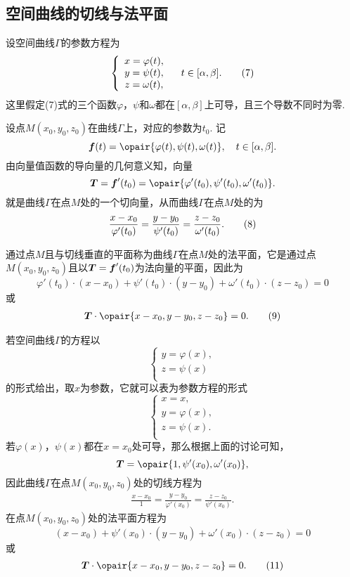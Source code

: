 \subsection{空间曲线的切线与法平面}
设空间曲线\(\Gamma\)的参数方程为\begin{gather}
\left\{ \begin{array}{c}
x = \varphi(t), \\
y = \psi(t), \\
z = \omega(t), \\
\end{array} \right.
\quad
t \in [\alpha,\beta].
\tag7
\end{gather}这里假定(7)式的三个函数\(\varphi\)，\(\psi\)和\(\omega\)都在\([\alpha,\beta]\)上可导，且三个导数不同时为零.

设点\(M(x_0,y_0,z_0)\)在曲线\(\Gamma\)上，对应的参数为\(t_0\).
记\[
\mat{f}(t)=\opair{\varphi(t),\psi(t),\omega(t)},
\quad t\in[\alpha,\beta].
\]由向量值函数的导向量的几何意义知，向量
\begin{equation}
\mat{T} = \mat{f}'(t_0) = \opair{\varphi'(t_0),\psi'(t_0),\omega'(t_0)}.
\end{equation}
就是曲线\(\Gamma\)在点\(M\)处的一个切向量，从而曲线\(\Gamma\)在点\(M\)处的为\begin{gather}
\frac{x-x_0}{\varphi'(t_0)}
=\frac{y-y_0}{\psi'(t_0)}
=\frac{z-z_0}{\omega'(t_0)}.
\tag8
\end{gather}

通过点\(M\)且与切线垂直的平面称为曲线\(\Gamma\)在点\(M\)处的法平面，它是通过点\(M(x_0,y_0,z_0)\)且以\(\boldsymbol{T}=\boldsymbol{f}'(t_0)\)为法向量的平面，因此为\[
\varphi'(t_0) \cdot (x-x_0) + \psi'(t_0) \cdot (y-y_0) + \omega'(t_0) \cdot (z-z_0) = 0
\]或\begin{gather}
\mat{T}\cdot\opair{x-x_0,y-y_0,z-z_0}=0.
\tag9
\end{gather}

若空间曲线\(\Gamma\)的方程以\[
\left\{ \begin{array}{l}
y = \varphi(x), \\
z = \psi(x) \\
\end{array} \right.
\]的形式给出，取\(x\)为参数，它就可以表为参数方程的形式\[
\left\{ \begin{array}{l}
x = x, \\
y = \varphi(x), \\
z = \psi(x). \\
\end{array} \right.
\]若\(\varphi(x)\)，\(\psi(x)\)都在\(x=x_0\)处可导，那么根据上面的讨论可知，\[
\mat{T} = \opair{1,\psi'(x_0),\omega'(x_0)},
\]因此曲线\(\Gamma\)在点\(M(x_0,y_0,z_0)\)处的切线方程为\begin{gather}
\frac{x-x_0}{1}
=\frac{y-y_0}{\varphi'(x_0)}
=\frac{z-z_0}{\psi'(x_0)}.
\tag{10}
\end{gather}在点\(M(x_0,y_0,z_0)\)处的法平面方程为\[
(x-x_0) + \psi'(x_0) \cdot (y-y_0) + \omega'(x_0) \cdot (z-z_0) = 0
\]或\begin{gather}
\mat{T}\cdot\opair{x-x_0,y-y_0,z-z_0}=0.
\tag{11}
\end{gather}


